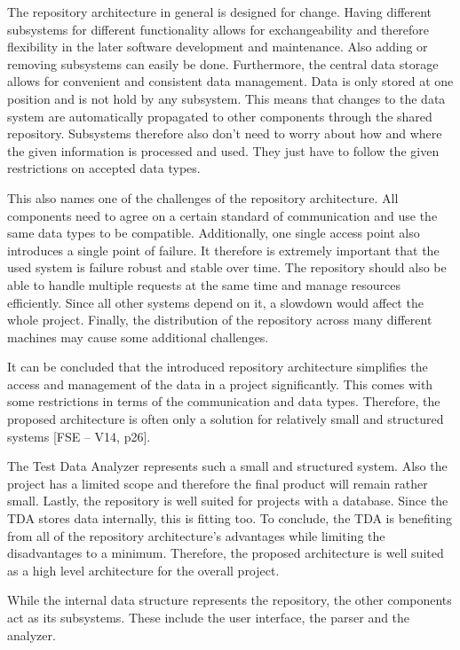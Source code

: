 The repository architecture in general is designed for change. Having different subsystems for different functionality allows for exchangeability and therefore flexibility in the later software development and maintenance. Also adding or removing subsystems can easily be done. Furthermore, the central data storage allows for convenient and consistent data management. Data is only stored at one position and is not hold by any subsystem. This means that changes to the data system are automatically propagated to other components through the shared repository. Subsystems therefore also don't need to worry about how and where the given information is processed and used. They just have to follow the given restrictions on accepted data types.

This also names one of the challenges of the repository architecture. All components need to agree on a certain standard of communication and use the same data types to be compatible. Additionally, one single access point also introduces a single point of failure. It therefore is extremely important that the used system is failure robust and stable over time. The repository should also be able to handle multiple requests at the same time and manage resources efficiently. Since all other systems depend on it, a slowdown would affect the whole project. Finally, the distribution of the repository across many different machines may cause some additional challenges.

It can be concluded that the introduced repository architecture simplifies the access and management of the data in a project significantly. This comes with some restrictions in terms of the communication and data types. Therefore, the proposed architecture is often only a solution for relatively small and structured systems [FSE – V14, p26].

The Test Data Analyzer represents such a small and structured system. Also the project has a limited scope and therefore the final product will remain rather small. Lastly, the repository is well suited for projects with a database. Since the TDA stores data internally, this is fitting too. To conclude, the TDA is benefiting from all of the repository architecture's advantages while limiting the disadvantages to a minimum. Therefore, the proposed architecture is well suited as a high level architecture for the overall project.

While the internal data structure represents the repository, the other components act as its subsystems. These include the user interface, the parser and the analyzer.

